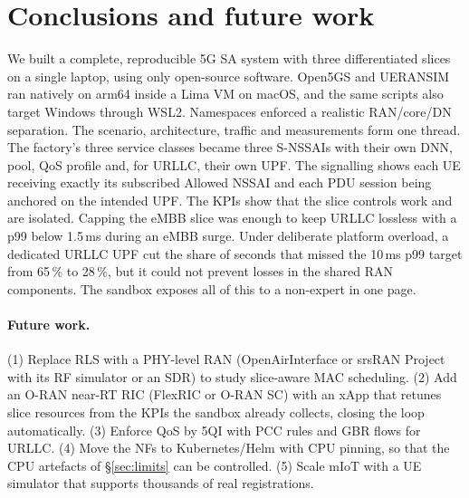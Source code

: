 \section{Conclusions and future work}\label{sec:conclusion}
We built a complete, reproducible 5G SA system with three differentiated slices on a single
laptop, using only open-source software. Open5GS and UERANSIM ran natively on arm64 inside a
Lima VM on macOS, and the same scripts also target Windows through WSL2. Namespaces enforced
a realistic RAN/core/DN separation. The scenario,
architecture, traffic and measurements form one thread. The factory's three service classes
became three S-NSSAIs with their own DNN, pool, QoS profile and, for URLLC, their own UPF. The
signalling shows each UE receiving exactly its subscribed Allowed NSSAI and each PDU session
being anchored on the intended UPF. The KPIs show that the slice controls work and are
isolated. Capping the eMBB slice was enough to keep URLLC lossless with a p99 below 1.5\,ms during an
eMBB surge. Under deliberate platform overload, a dedicated URLLC UPF cut the share of
seconds that missed the 10\,ms p99 target from 65\,\% to 28\,\%, but it could not prevent losses in the shared RAN
components.
The sandbox exposes all of this to a non-expert in one page.

\paragraph{Future work.}
(1) Replace RLS with a PHY-level RAN (OpenAirInterface or srsRAN Project with its RF
simulator or an SDR) to study slice-aware MAC scheduling.
(2) Add an O-RAN near-RT RIC (FlexRIC or O-RAN SC) with an xApp that retunes slice resources
from the KPIs the sandbox already collects, closing the loop automatically.
(3) Enforce QoS by 5QI with PCC rules and GBR flows for URLLC.
(4) Move the NFs to Kubernetes/Helm with CPU pinning, so that the CPU artefacts of
\S\ref{sec:limits} can be controlled.
(5) Scale mIoT with a UE simulator that supports thousands of real registrations.
